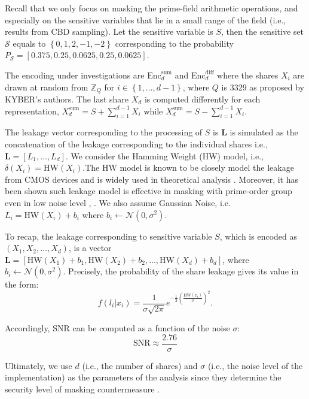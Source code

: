 \documentclass{llncs}
\begin{document}
	Recall that we only focus on masking the prime-field arithmetic operations, and especially on the sensitive variables that lie in a small range of the field (i.e., results from CBD sampling). Let the sensitive variable is $S$, then the sensitive set $\mathcal{S}$ equals to $\left\lbrace 0, 1, 2, -1, -2 \right\rbrace $ corresponding to the probability $P_{\mathcal{S}} = [ 0.375,  0.25,   0.0625, 0.25,   0.0625]$. 
	
	The encoding under investigations are $\text{Enc}^{\text{sum}}_{d}$ and $\text{Enc}^{\text{diff}}_{d}$ where the shares $X_i$ are drawn at random from $\mathbb{Z}_Q$ for $i \in \left\lbrace 1, \dots, d-1\right\rbrace $, where $Q$ is 3329 as proposed by KYBER's authors. The last share $X_d$ is computed differently for each representation, $X_d^{\text{sum}} = S + \sum_{i = 1}^{d-1} X_i$ while $X_d^{\text{sum}} = S - \sum_{i = 1}^{d-1} X_i$.
	
	The leakage vector corresponding to the processing of $S$ is $\bm{L}$ is simulated as the concatenation of the leakage corresponding to the individual shares i.e., $\bm{L} = \left[ L_1, \dots, L_d \right] $. We consider the Hamming Weight (HW) model, i.e., $\delta(X_i) = \text{HW}(X_i)$.The HW model is known to be closely model the leakage from CMOS devices  and is widely used in theoretical analysis \cite{2dpa}. Moreover, it has been shown such leakage model is effective in masking with prime-order group even in low noise level \cite{optimalmask}, \cite{primemask}. We also assume Gaussian Noise, i.e. $L_i = \text{HW}(X_i) + b_i$ where $b_i \leftarrow \mathcal{N}(0, \sigma^2)$. 
	
	To recap, the leakage corresponding to sensitive variable $S$, which is encoded as $(X_1, X_2, \dots, X_d)$, is a vector $\bm{L} = \left[ \text{HW}(X_1) + b_1, \text{HW}(X_2) + b_2, \dots, \text{HW}(X_d) + b_d \right] $, where $b_i \leftarrow \mathcal{N}(0, \sigma^2) $. Precisely, the probability of the share leakage gives its value in the form:
	\begin{equation}\label{eq:gl}
		f(l_i|x_i) = \frac{1}{\sigma\sqrt{2\pi}} e^{ -\frac{1}{2}\left( \frac{\text{HW}(x_i)}{\sigma}\right) ^2 }.
	\end{equation}
	
	Accordingly, SNR can be computed as a function of the noise $\sigma$:
	$$\text{SNR} \approx \frac{2.76}{\sigma}$$
	
	Ultimately, we use $d$ (i.e., the number of shares) and $\sigma$ (i.e., the noise level of the implementation) as the parameters of the analysis since they determine the security level of masking countermeasure .
	
\end{document}
